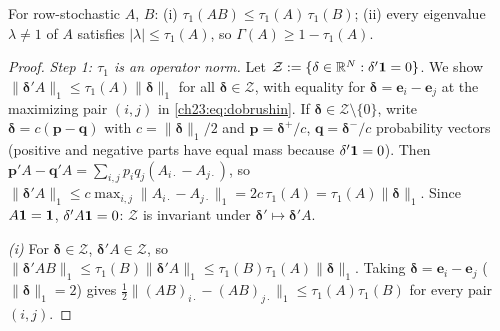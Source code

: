 \documentclass[../structural_economics_book.tex]{subfiles}
\begin{document}
\begin{proposition}\label{ch23:prop:dobrushin}
For row-stochastic $A$, $B$: (i) $\tau_1(AB) \le \tau_1(A)\,\tau_1(B)$; (ii) every eigenvalue $\lambda \neq 1$ of $A$ satisfies $|\lambda| \le \tau_1(A)$, so $\Gamma(A) \ge 1 - \tau_1(A)$.
\end{proposition}
\begin{proof}
\emph{Step 1: $\tau_1$ is an operator norm.} Let $\mathcal{Z} := \{\delta \in \mathbb{R}^N : \delta'\mathbf{1} = 0\}$. We show $\|\boldsymbol{\delta}'A\|_1 \le \tau_1(A)\|\boldsymbol{\delta}\|_1$ for all $\boldsymbol{\delta} \in \mathcal{Z}$, with equality for $\boldsymbol{\delta} = \mathbf{e}_i - \mathbf{e}_j$ at the maximizing pair $(i,j)$ in \eqref{ch23:eq:dobrushin}. If $\boldsymbol{\delta} \in \mathcal{Z}\setminus\{0\}$, write $\boldsymbol{\delta} = c(\mathbf{p} - \mathbf{q})$ with $c = \|\boldsymbol{\delta}\|_1/2$ and $\mathbf{p} = \boldsymbol{\delta}^+/c$, $\mathbf{q} = \boldsymbol{\delta}^-/c$ probability vectors (positive and negative parts have equal mass because $\delta'\mathbf{1} = 0$). Then $\mathbf{p}'A - \mathbf{q}'A = \sum_{i,j}p_iq_j(A_{i\cdot} - A_{j\cdot})$, so $\|\boldsymbol{\delta}'A\|_1 \le c\max_{i,j}\|A_{i\cdot} - A_{j\cdot}\|_1 = 2c\,\tau_1(A) = \tau_1(A)\|\boldsymbol{\delta}\|_1$. Since $A\mathbf{1} = \mathbf{1}$, $\delta'A\mathbf{1} = 0$: $\mathcal{Z}$ is invariant under $\boldsymbol{\delta}' \mapsto \boldsymbol{\delta}'A$.

\emph{(i)} For $\boldsymbol{\delta} \in \mathcal{Z}$, $\boldsymbol{\delta}'A \in \mathcal{Z}$, so $\|\boldsymbol{\delta}'AB\|_1 \le \tau_1(B)\|\boldsymbol{\delta}'A\|_1 \le \tau_1(B)\tau_1(A)\|\boldsymbol{\delta}\|_1$. Taking $\boldsymbol{\delta} = \mathbf{e}_i - \mathbf{e}_j$ ($\|\boldsymbol{\delta}\|_1 = 2$) gives $\tfrac12\|(AB)_{i\cdot} - (AB)_{j\cdot}\|_1 \le \tau_1(A)\tau_1(B)$ for every pair $(i,j)$.


\end{proof}
\end{document}
